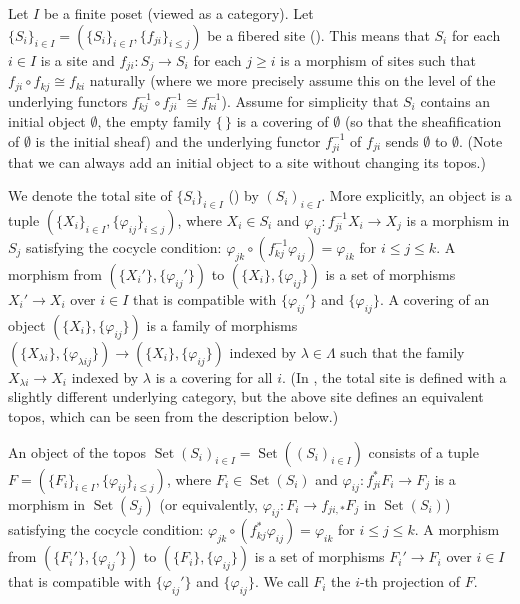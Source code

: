 \documentclass{amsart}
\theoremstyle{remark}
\numberwithin{equation}{subsection}
\newcommand{\compose}{\mathbin{\circ}}
\DeclareMathOperator{\Set}{Set}
\begin{document}
Let $I$ be a finite poset (viewed as a category).
Let $\{S_{i}\}_{i \in I} = (\{S_{i}\}_{i \in I}, \{f_{j i}\}_{i \le j})$ be
a fibered site (\cite[Expos\'e VI, \S 7.2.1]{AGV72b}).
This means that $S_{i}$ for each $i \in I$ is a site and
$f_{j i} \colon S_{j} \to S_{i}$ for each $j \ge i$ is a morphism of sites
such that $f_{j i} \compose f_{k j} \cong f_{k i}$ naturally
(where we more precisely assume this on the level of the underlying functors
$f_{k j}^{-1} \compose f_{j i}^{-1} \cong f_{k i}^{-1}$).
Assume for simplicity that
$S_{i}$ contains an initial object $\emptyset$,
the empty family $\{\,\}$ is a covering of $\emptyset$
(so that the sheafification of $\emptyset$ is the initial sheaf)
and the underlying functor $f_{j i}^{-1}$ of $f_{j i}$ sends $\emptyset$ to $\emptyset$.
(Note that we can always add an initial object to a site without changing its topos.)

We denote the total site of $\{S_{i}\}_{i \in I}$
(\cite[Expos\'e VI, \S D\'efinition 7.4.1]{AGV72b})
by $(S_{i})_{i \in I}$.
More explicitly, an object is a tuple $(\{X_{i}\}_{i \in I}, \{\varphi_{i j}\}_{i \le j})$,
where $X_{i} \in S_{i}$ and
$\varphi_{i j} \colon f_{j i}^{-1} X_{i} \to X_{j}$ is a morphism in $S_{j}$
satisfying the cocycle condition:
$\varphi_{j k} \compose (f_{k j}^{-1} \varphi_{i j}) = \varphi_{i k}$
for $i \le j \le k$.
A morphism from $(\{X_{i}'\}, \{\varphi_{i j}'\})$ to $(\{X_{i}\}, \{\varphi_{i j}\})$
is a set of morphisms $X_{i}' \to X_{i}$ over $i \in I$ that is compatible with
$\{\varphi_{i j}'\}$ and $\{\varphi_{i j}\}$.
A covering of an object $(\{X_{i}\}, \{\varphi_{i j}\})$ is a family of morphisms
$(\{X_{\lambda i}\}, \{\varphi_{\lambda i j}\}) \to (\{X_{i}\}, \{\varphi_{i j}\})$
indexed by $\lambda \in \Lambda$
such that the family $X_{\lambda i} \to X_{i}$ indexed by $\lambda$ is a covering for all $i$.
(In \cite[Expos\'e VI, \S D\'efinition 7.4.1]{AGV72b},
the total site is defined with a slightly different underlying category,
but the above site defines an equivalent topos,
which can be seen from the description below.)

An object of the topos $\Set(S_{i})_{i \in I} = \Set((S_{i})_{i \in I})$ consists of a tuple
$F = (\{F_{i}\}_{i \in I}, \{\varphi_{i j}\}_{i \le j})$,
where $F_{i} \in \Set(S_{i})$ and
$\varphi_{i j} \colon f_{j i}^{\ast} F_{i} \to F_{j}$ is a morphism in $\Set(S_{j})$
(or equivalently, $\varphi_{i j} \colon F_{i} \to f_{j i, \ast} F_{j}$ in $\Set(S_{i})$)
satisfying the cocycle condition: $\varphi_{j k} \compose (f_{k j}^{\ast} \varphi_{i j}) = \varphi_{i k}$
for $i \le j \le k$.
A morphism from $(\{F_{i}'\}, \{\varphi_{i j}'\})$ to $(\{F_{i}\}, \{\varphi_{i j}\})$
is a set of morphisms $F_{i}' \to F_{i}$ over $i \in I$ that is compatible with
$\{\varphi_{i j}'\}$ and $\{\varphi_{i j}\}$.
We call $F_{i}$ the $i$-th projection of $F$.
\end{document}
